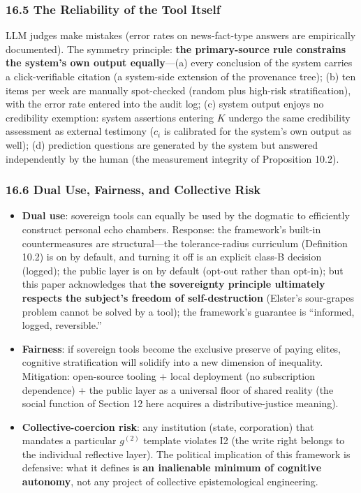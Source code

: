 \documentclass[
  11pt]{article}
\providecommand{\tightlist}{%
  \setlength{\itemsep}{0pt}\setlength{\parskip}{0pt}}
\begin{document}
\subsubsection{16.5 The Reliability of the Tool
Itself}\label{the-reliability-of-the-tool-itself}

LLM judges make mistakes (error rates on news-fact-type answers are
empirically documented). The symmetry principle: \textbf{the
primary-source rule constrains the system's own output equally}---(a)
every conclusion of the system carries a click-verifiable citation (a
system-side extension of the provenance tree); (b) ten items per week
are manually spot-checked (random plus high-risk stratification), with
the error rate entered into the audit log; (c) system output enjoys no
credibility exemption: system assertions entering \(K\) undergo the same
credibility assessment as external testimony (\(c_i\) is calibrated for
the system's own output as well); (d) prediction questions are generated
by the system but answered independently by the human (the measurement
integrity of Proposition 10.2).

\subsubsection{16.6 Dual Use, Fairness, and Collective
Risk}\label{dual-use-fairness-and-collective-risk}

\begin{itemize}
\tightlist
\item
  \textbf{Dual use}: sovereign tools can equally be used by the dogmatic
  to efficiently construct personal echo chambers. Response: the
  framework's built-in countermeasures are structural---the
  tolerance-radius curriculum (Definition 10.2) is on by default, and
  turning it off is an explicit class-B decision (logged); the public
  layer is on by default (opt-out rather than opt-in); but this paper
  acknowledges that \textbf{the sovereignty principle ultimately
  respects the subject's freedom of self-destruction} (Elster's
  sour-grapes problem cannot be solved by a tool); the framework's
  guarantee is ``informed, logged, reversible.''
\item
  \textbf{Fairness}: if sovereign tools become the exclusive preserve of
  paying elites, cognitive stratification will solidify into a new
  dimension of inequality. Mitigation: open-source tooling + local
  deployment (no subscription dependence) + the public layer as a
  universal floor of shared reality (the social function of Section 12
  here acquires a distributive-justice meaning).
\item
  \textbf{Collective-coercion risk}: any institution (state,
  corporation) that mandates a particular \(g^{(2)}\) template violates
  I2 (the write right belongs to the individual reflective layer). The
  political implication of this framework is defensive: what it defines
  is \textbf{an inalienable minimum of cognitive autonomy}, not any
  project of collective epistemological engineering.
\end{itemize}
\end{document}
